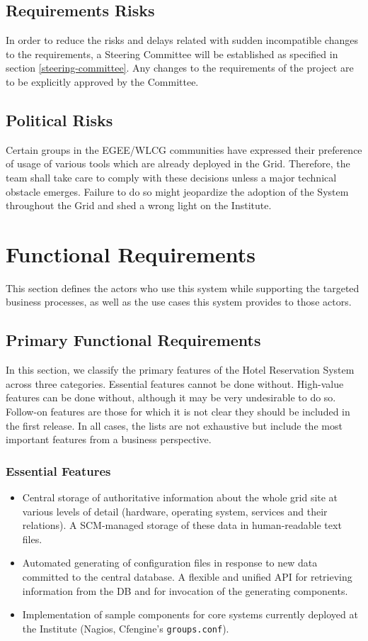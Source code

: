 \documentclass[12pt]{article}
\begin{document}
\subsection{Requirements Risks}
In order to reduce the risks and delays related with sudden incompatible changes
to the requirements, a Steering Committee will be established as specified in
section \ref{steering-committee}.  Any changes to the requirements of the
project are to be explicitly approved by the Committee.

\subsection{Political Risks}
Certain groups in the EGEE/WLCG communities have expressed their preference of
usage of various tools which are already deployed in the Grid.  Therefore, the
team shall take care to comply with these decisions unless a major technical
obstacle emerges.  Failure to do so might jeopardize the adoption of the System
throughout the Grid and shed a wrong light on the Institute.


\section{Functional Requirements}
This section defines the actors who use this system while supporting the targeted business processes, as well as the use cases this 
system provides to those actors.

\subsection{Primary Functional Requirements}
In this section, we classify the primary features of the Hotel Reservation
System across three categories.  Essential features cannot be done without.
High-value features can be done without, although it may be very undesirable to
do so. Follow-on features are those for which it is not clear they should be
included in the first release. In all cases, the lists are not exhaustive but
include the most important features from a business perspective.

\subsubsection{Essential Features}
\begin{itemize}
	\item Central storage of authoritative information about the whole grid site
        at various levels of detail (hardware, operating system, services and
        their relations).  A SCM-managed storage of these data in human-readable
        text files.
	\item Automated generating of configuration files in response to new data
        committed to the central database.  A flexible and unified API for
        retrieving information from the DB and for invocation of the generating
        components.
    \item Implementation of sample components for core systems currently
        deployed at the Institute (Nagios, Cfengine's {\tt groups.conf}).
\end{itemize}
\end{document}
